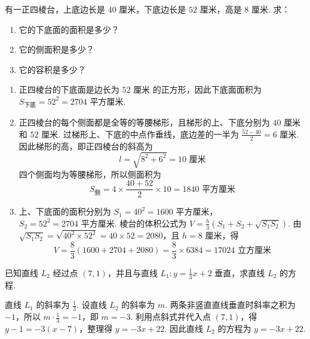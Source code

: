 \begin{problem}
有一正四棱台，上底边长是 \(40\text{ 厘米}\)，下底边长是 \(52\text{ 厘米}\)，高是 \(8\text{ 厘米}\). 求：

\begin{enumerate}
\item 它的下底面的面积是多少？
\item 它的侧面积是多少？
\item 它的容积是多少？
\end{enumerate}
\end{problem}

\begin{solution}
\begin{enumerate}
\item 正四棱台的下底面是边长为 \(52\text{ 厘米}\) 的正方形，因此下底面面积为 \(S_{\text{下底}}=52^2=2704\text{ 平方厘米}\).

\item 正四棱台的每个侧面都是全等的等腰梯形，且梯形的上、下底分别为 \(40\text{ 厘米}\) 和 \(52\text{ 厘米}\). 过梯形上、下底的中点作垂线，底边差的一半为 \(\frac{52-40}{2}=6\text{ 厘米}\). 因此梯形的高，即正四棱台的斜高为
\[
l=\sqrt{8^2+6^2}=10\text{ 厘米}
\]
四个侧面均为等腰梯形，所以侧面积为
\[
S_{\text{侧}}=4\times\frac{40+52}{2}\times10=1840\text{ 平方厘米}
\]

\item 上、下底面的面积分别为 \(S_1=40^2=1600\text{ 平方厘米}\)，\(S_2=52^2=2704\text{ 平方厘米}\). 棱台的体积公式为 \(V=\frac{h}{3}\left(S_1+S_2+\sqrt{S_1S_2}\right)\). 由 \(\sqrt{S_1S_2}=\sqrt{40^2\times52^2}=40\times52=2080\)，且 \(h=8\text{ 厘米}\)，得
\[
V=\frac{8}{3}\left(1600+2704+2080\right)=\frac{8}{3}\times6384=17024\text{ 立方厘米}
\]
\end{enumerate}
\end{solution}

\begin{problem}
已知直线 \(L_2\) 经过点 \(\left(7,1\right)\)，并且与直线 \(L_1:y=\frac{1}{3}x+2\) 垂直，求直线 \(L_2\) 的方程.
\end{problem}

\begin{solution}
直线 \(L_1\) 的斜率为 \(\frac{1}{3}\). 设直线 \(L_2\) 的斜率为 \(m\). 两条非竖直直线垂直时斜率之积为 \(-1\)，所以 \(m\cdot\frac{1}{3}=-1\)，即 \(m=-3\). 利用点斜式并代入点 \(\left(7,1\right)\)，得 \(y-1=-3\left(x-7\right)\)，整理得 \(y=-3x+22\). 因此直线 \(L_2\) 的方程为 \(y=-3x+22\).
\end{solution}

